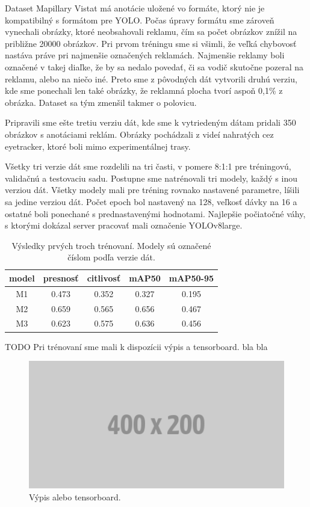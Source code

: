 Dataset Mapillary Vistat má anotácie uložené vo formáte, ktorý nie je kompatibilný s formátom pre YOLO. Počas úpravy formátu sme zároveň vynechali obrázky, ktoré neobsahovali reklamu, čím sa počet obrázkov znížil na približne 20000 obrázkov. Pri prvom tréningu sme si všimli, že veľká chybovosť nastáva práve pri najmenšie označených reklamách. Najmenšie reklamy boli označené v takej diaľke, že by sa nedalo povedať, či sa vodič skutočne pozeral na reklamu, alebo na niečo iné. Preto sme z pôvodných dát vytvorili druhú verziu, kde sme ponechali len také obrázky, že reklamná plocha tvorí aspoň 0,1\% z obrázka. Dataset sa tým zmenšil takmer o polovicu. 

Pripravili sme ešte tretiu verziu dát, kde sme k vytriedeným dátam pridali 350 obrázkov s anotáciami reklám. Obrázky pochádzali z videí nahratých cez eyetracker, ktoré boli mimo experimentálnej trasy. 

Všetky tri verzie dát sme rozdelili na tri časti, v pomere 8:1:1 pre tréningovú, validačnú a testovaciu sadu. Postupne sme natrénovali tri modely, každý s inou verziou dát. Všetky modely mali pre tréning rovnako nastavené parametre, líšili sa jedine verziou dát. Počet epoch bol nastavený na 128, veľkosť dávky na 16 a ostatné boli ponechané s prednastavenými hodnotami. Najlepšie počiatočné váhy, s ktorými dokázal server pracovať mali označenie YOLOv8large.
\\
\begin{table}[ht]
\centering
\begin{tabular}{ |c c c c c|  }
\hline
model  &  presnosť & citlivosť & mAP50 & mAP50-95 \\
\hline
M1  & 0.473 & 0.352	& 0.327	& 0.195 \\
M2  & 0.659 & 0.565 & 0.656 & 0.467 \\
M3  & 0.623 & 0.575 & 0.636 & 0.456 \\
\hline
\end{tabular}
\caption{Výsledky prvých troch trénovaní. Modely sú označené číslom podľa verzie dát.}
\label{table:test1}
\end{table}

TODO Pri trénovaní sme mali k dispozícii výpis a tensorboard. bla bla
\\
\begin{figure}[ht]
    \centering
    \includegraphics[width=1\textwidth]{images/02/placeholder.png}
    \caption{Výpis alebo tensorboard.}
    \label{img:lab}
\end{figure}


